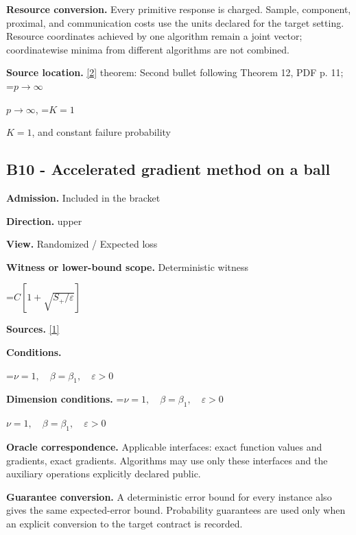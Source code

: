 \documentclass[10pt,a4paper]{article}
\newcommand{\AtlasMath}[1]{\par\begingroup\centering\setbox0=\hbox{$\displaystyle #1$}\ifdim\wd0>1.4\linewidth\typeout{ATLAS WIDE FORMULA: \the\wd0}\fi\ifdim\wd0>\linewidth\resizebox{\linewidth}{!}{\box0}\else\box0\fi\par\endgroup}
\newcommand{\AtlasInlineMath}[1]{\begingroup\setbox0=\hbox{$#1$}\ifdim\wd0>.4\linewidth\endgroup\AtlasMath{#1}\else\endgroup$#1$\fi}
\begin{document}
\textbf{Resource conversion.} Every primitive response is charged. Sample, component, proximal, and communication costs use the units declared for the target setting. Resource coordinates achieved by one algorithm remain a joint vector; coordinatewise minima from different algorithms are not combined.



\textbf{Source location.} \href{https://proceedings.mlr.press/v99/diakonikolas19c/diakonikolas19c.pdf}{[2]} theorem: Second bullet following Theorem 12, PDF p. 11; \AtlasInlineMath{p\to\infty}, \AtlasInlineMath{K=1}, and constant failure probability



\subsection{B10 - Accelerated gradient method on a ball}


\textbf{Admission.} Included in the bracket



\textbf{Direction.} upper



\textbf{View.} Randomized / Expected loss



\textbf{Witness or lower-bound scope.} Deterministic witness



\AtlasMath{C[1+\sqrt{S_+/\varepsilon}]}


\textbf{Sources.} \href{https://optimization-online.org/wp-content/uploads/2010/12/2865.pdf}{[1]}



\textbf{Conditions.}
\AtlasMath{\nu=1,\quad\beta=\beta_1,\quad\varepsilon>0}




\textbf{Dimension conditions.} \AtlasInlineMath{\nu=1,\quad\beta=\beta_1,\quad\varepsilon>0}



\textbf{Oracle correspondence.} Applicable interfaces: exact function values and gradients, exact gradients. Algorithms may use only these interfaces and the auxiliary operations explicitly declared public.



\textbf{Guarantee conversion.} A deterministic error bound for every instance also gives the same expected-error bound. Probability guarantees are used only when an explicit conversion to the target contract is recorded.
\end{document}
